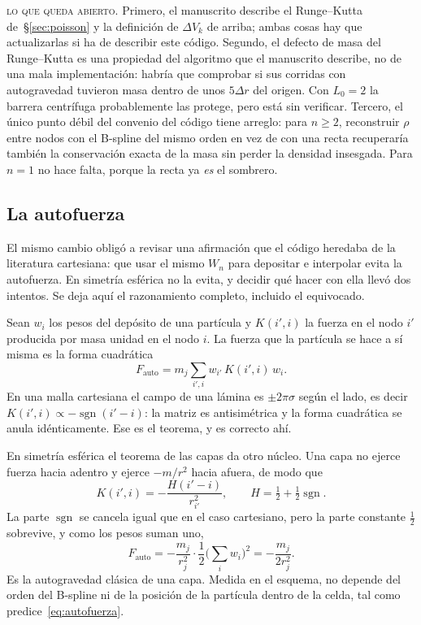 \documentclass[11pt,a4paper]{article}
\begin{document}
\begin{aviso}
\textsc{lo que queda abierto.} Primero, el manuscrito describe el Runge--Kutta
de~\S\ref{sec:poisson} y la definición de $\Delta V_k$ de
arriba; ambas cosas hay que actualizarlas si ha de describir este código. Segundo, el
defecto de masa del Runge--Kutta es una propiedad del algoritmo que el manuscrito
describe, no de una mala implementación: habría que comprobar si sus corridas con
autogravedad tuvieron masa dentro de unos $5\Delta r$ del origen. Con $L_0=2$ la barrera
centrífuga probablemente las protege, pero está sin verificar. Tercero, el único punto
débil del convenio del código tiene arreglo: para $n\ge2$, reconstruir $\rho$ entre nodos
con el B-spline del mismo orden en vez de con una recta recuperaría también la
conservación exacta de la masa sin perder la densidad insesgada. Para $n=1$ no hace
falta, porque la recta ya \emph{es} el sombrero.
\end{aviso}

\subsection{La autofuerza}
\label{sec:autofuerza}

El mismo cambio obligó a revisar una afirmación que el código heredaba de la literatura
cartesiana: que usar el mismo $W_n$ para depositar e interpolar evita la autofuerza. En
simetría esférica no la evita, y decidir qué hacer con ella llevó dos intentos. Se deja
aquí el razonamiento completo, incluido el equivocado.

Sean $w_i$ los pesos del depósito de una partícula y $K(i',i)$ la fuerza en el nodo $i'$
producida por masa unidad en el nodo $i$. La fuerza que la partícula se hace a sí misma
es la forma cuadrática
\begin{equation}
  F_{\text{auto}}=m_j\sum_{i',i} w_{i'}\,K(i',i)\,w_i .
\end{equation}
En una malla cartesiana el campo de una lámina es $\pm2\pi\sigma$ según el lado, es decir
$K(i',i)\propto-\operatorname{sgn}(i'-i)$: la matriz es antisimétrica y la forma
cuadrática se anula idénticamente. Ese es el teorema, y es correcto ahí.

En simetría esférica el teorema de las capas da otro núcleo. Una capa no ejerce fuerza
hacia adentro y ejerce $-m/r^{2}$ hacia afuera, de modo que
\begin{equation}
  K(i',i)=-\frac{H(i'-i)}{r_{i'}^{2}},\qquad H=\tfrac12+\tfrac12\operatorname{sgn} .
\end{equation}
La parte $\operatorname{sgn}$ se cancela igual que en el caso cartesiano, pero la parte
constante $\tfrac12$ sobrevive, y como los pesos suman uno,
\begin{equation}
  F_{\text{auto}}=-\frac{m_j}{r_j^{2}}\cdot\frac12\Big(\sum_i w_i\Big)^{2}
  =-\frac{m_j}{2r_j^{2}} .
  \label{eq:autofuerza}
\end{equation}
Es la autogravedad clásica de una capa. Medida en el esquema, no depende del orden del
B-spline ni de la posición de la partícula dentro de la celda, tal como
predice~\eqref{eq:autofuerza}.
\end{document}
